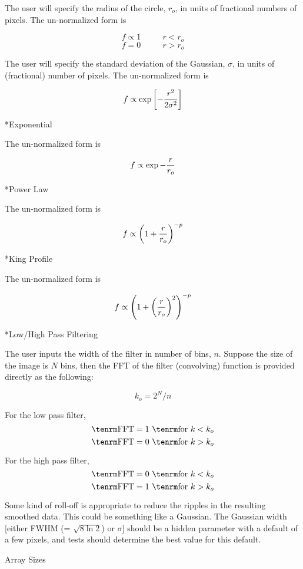 
{\list

The user will specify the radius of the circle, $r_o$, in units of
fractional numbers of pixels.  The un-normalized form is

}

$$ f \propto 1 ~~~~~~~~~~~~r < r_o$$
$$ f = 0 ~~~~~~~~~~~~r > r_o$$



{\list

The user will specify the standard deviation of the Gaussian,
$\sigma$,
in units of (fractional) number of pixels.  The un-normalized form is

}

$$f \propto \exp \left[- {r^2 \over 2 \sigma^2}\right]$$

\**Exponential

{\list

The un-normalized form is

}

$$f \propto \exp -{r \over r_o}$$

\**Power Law

{\list

The un-normalized form is

}

$$f \propto \left( 1 + {r \over r_o}\right) ^{-p}$$

\**King Profile

{\list

The un-normalized form is

}

$$f \propto \left( 1 + \left({r \over r_o}\right)^2 \right) ^{-p}$$

\**Low/High Pass Filtering

{\list

The user inputs the width of the filter in number of bins, $n$.  Suppose
the
size of the image is $N$ bins, then the
FFT of the filter (convolving) function is provided directly as the following:

}

$$k_o = 2 ^N/n$$

For the low pass filter, 
$${\rm FFT} = 1~{\rm for}~ k < k_o$$
$${\rm FFT} = 0~{\rm for}~ k > k_o$$

For the high pass filter, 
$${\rm FFT} = 0~{\rm for}~ k < k_o$$
$${\rm FFT} = 1~{\rm for}~ k > k_o$$

{\list

Some kind of roll-off is appropriate to reduce the ripples in the
resulting smoothed data.  This could be something like a Gaussian.
The Gaussian width [either FWHM (= $\sqrt{8 \ln 2}$) or $\sigma$] should be
a hidden parameter with a default
of a few pixels, and tests should determine the best value for this default.

}
\@{Array Sizes}

